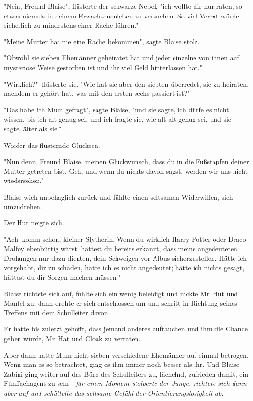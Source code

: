 {"Nein, Freund Blaise", flüsterte der schwarze Nebel, "ich wollte dir nur raten, so etwas niemals in deinem Erwachsenenleben zu versuchen. So viel Verrat würde sicherlich zu mindestens einer Rache führen."

"Meine Mutter hat nie eine Rache bekommen", sagte Blaise stolz.

"Obwohl sie sieben Ehemänner geheiratet hat und jeder einzelne von ihnen auf mysteriöse Weise gestorben ist und ihr viel Geld hinterlassen hat."

"Wirklich?", flüsterte sie. "Wie hat sie aber den siebten überredet, sie zu heiraten, nachdem er gehört hat, was mit den ersten sechs passiert ist?"

"Das habe ich Mum gefragt", sagte Blaise, "und sie sagte, ich dürfe es nicht wissen, bis ich alt genug sei, und ich fragte sie, wie alt alt genug sei, und sie sagte, älter als sie."

Wieder das flüsternde Glucksen.

"Nun denn, Freund Blaise, meinen Glückwunsch, dass du in die Fußstapfen deiner Mutter getreten bist. Geh, und wenn du nichts davon sagst, werden wir uns nicht wiedersehen."

Blaise wich unbehaglich zurück und fühlte einen seltsamen Widerwillen, sich umzudrehen.

Der Hut neigte sich.

"Ach, komm schon, kleiner Slytherin. Wenn du wirklich Harry Potter oder Draco Malfoy ebenbürtig wärst, hättest du bereits erkannt, dass meine angedeuteten Drohungen nur dazu dienten, dein Schweigen vor Albus sicherzustellen. Hätte ich vorgehabt, dir zu schaden, hätte ich es nicht angedeutet; hätte ich nichts gesagt, hättest du dir Sorgen machen müssen."

Blaise richtete sich auf, fühlte sich ein wenig beleidigt und nickte Mr~Hut und Mantel zu; dann drehte er sich entschlossen um und schritt in Richtung seines Treffens mit dem Schulleiter davon.

Er hatte bis zuletzt gehofft, dass jemand anderes auftauchen und ihm die Chance geben würde, Mr~Hat und Cloak zu verraten.

Aber dann hatte Mum nicht sieben verschiedene Ehemänner auf einmal betrogen. Wenn man es so betrachtet, ging es ihm immer noch besser als ihr. Und Blaise Zabini ging weiter auf das Büro des Schulleiters zu, lächelnd, zufrieden damit, ein Fünffachagent zu sein - \emph{für einen Moment stolperte der Junge, richtete sich dann aber auf und schüttelte das seltsame Gefühl der Orientierungslosigkeit ab.}

}

